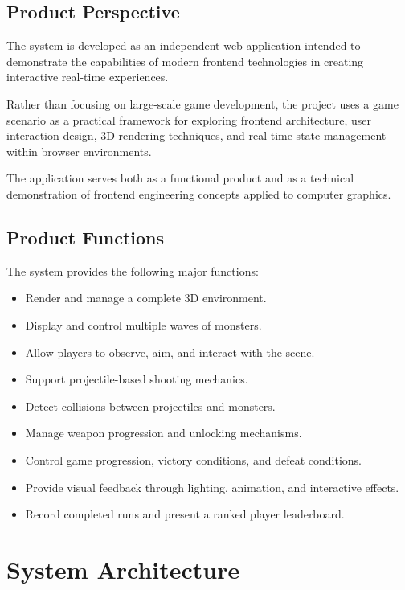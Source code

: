 \documentclass[11pt,a4paper]{article}
\begin{document}
\subsection{Product Perspective}

The system is developed as an independent web application intended to
demonstrate the capabilities of modern frontend technologies in creating
interactive real-time experiences.

Rather than focusing on large-scale game development, the project uses a game
scenario as a practical framework for exploring frontend architecture, user
interaction design, 3D rendering techniques, and real-time state management
within browser environments.

The application serves both as a functional product and as a technical
demonstration of frontend engineering concepts applied to computer graphics.

\subsection{Product Functions}

The system provides the following major functions:

\begin{itemize}
  \item Render and manage a complete 3D environment.
  \item Display and control multiple waves of monsters.
  \item Allow players to observe, aim, and interact with the scene.
  \item Support projectile-based shooting mechanics.
  \item Detect collisions between projectiles and monsters.
  \item Manage weapon progression and unlocking mechanisms.
  \item Control game progression, victory conditions, and defeat conditions.
  \item Provide visual feedback through lighting, animation, and interactive
        effects.
  \item Record completed runs and present a ranked player leaderboard.
\end{itemize}

\section{System Architecture}
\end{document}
